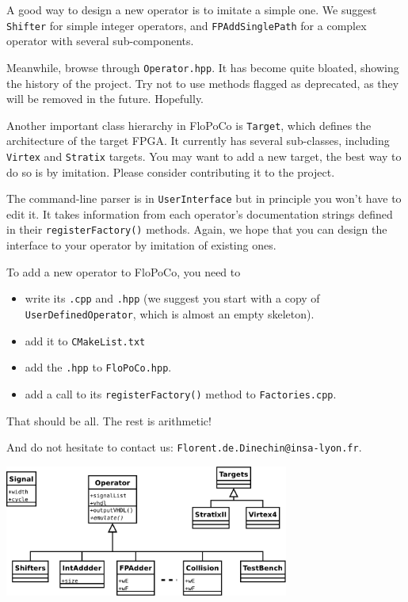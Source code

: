 \documentclass{article}
\begin{document}
A good way to design a new operator is to imitate a simple one. We suggest
\texttt{Shifter} for simple integer operators, and \texttt{FPAddSinglePath}
for a complex operator with several sub-components.

Meanwhile, browse through \texttt{Operator.hpp}. It has become quite bloated, showing
the history of the project. Try not to use methods flagged as
deprecated, as they will be removed in the future. Hopefully.%

Another important class hierarchy in FloPoCo is \texttt{Target}, which
defines the architecture of the target FPGA. It currently has several sub-classes,
including \texttt{Virtex} and \texttt{Stratix} targets. You may want to
add a new target, the best way to do so is by imitation. Please
consider contributing it to the project.

The command-line parser is in \texttt{UserInterface} but in principle you won't have to edit it.
It takes information from each operator's documentation strings defined in their \texttt{registerFactory()} methods. 
Again, we hope that you can design the interface to your operator by imitation of existing ones.

To add a new operator to FloPoCo, you need to 
\begin{itemize}
\item write its \texttt{.cpp} and \texttt{.hpp} (we suggest you start with a copy of  \texttt{UserDefinedOperator}, which is almost an empty skeleton).
\item add it to \texttt{CMakeList.txt}
\item add the \texttt{.hpp} to \texttt{FloPoCo.hpp}.
\item add a call to its  \texttt{registerFactory()} method to \texttt{Factories.cpp}. 
\end{itemize}

That should be all. The rest is arithmetic!

And do not hesitate to contact us: \texttt{Florent.de.Dinechin@insa-lyon.fr}.

\begin{center}
  \includegraphics[width=0.7\textwidth]{../Figures/FloPoCoClasses.pdf}        
\end{center}
\end{document}
